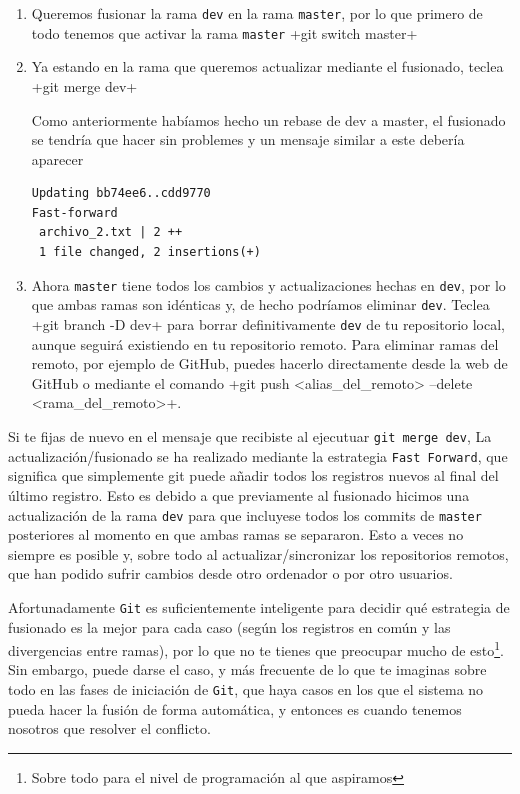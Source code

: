 \documentclass[a5paper,10pt]{article}
\begin{document}
    \begin{enumerate}
     \item Queremos fusionar la rama \verb+dev+ en la rama \verb+master+, por lo que primero de todo tenemos que activar la rama \verb+master+
     \cverb+git switch master+
     \item Ya estando en la rama que queremos actualizar mediante el fusionado, teclea
     \cverb+git merge dev+
     
     Como anteriormente habíamos hecho un rebase de dev a master, el fusionado se tendría que hacer sin problemes y un mensaje similar a este debería aparecer
     \begin{lstlisting}[style=custom]
Updating bb74ee6..cdd9770
Fast-forward
 archivo_2.txt | 2 ++
 1 file changed, 2 insertions(+)
     \end{lstlisting}
     
     \item Ahora \verb+master+ tiene todos los cambios y actualizaciones hechas en \verb+dev+, por lo que ambas ramas son idénticas y, de hecho podríamos eliminar \verb+dev+. Teclea 
     \cverb+git branch -D dev+ para borrar definitivamente \verb+dev+ de tu repositorio local, aunque seguirá existiendo en tu repositorio remoto. Para eliminar ramas del remoto, por ejemplo de GitHub, puedes hacerlo directamente desde la web de GitHub o mediante el comando \cverb+git push <alias_del_remoto>  --delete <rama_del_remoto>+.

    \end{enumerate}
    
    Si te fijas de nuevo en el mensaje que recibiste al ejecutuar \verb+git merge dev+, La actualización/fusionado se ha realizado mediante la estrategia \verb+Fast Forward+, que significa que simplemente git puede añadir todos los registros nuevos al final del último registro. Esto es debido a que previamente al fusionado hicimos una actualización de la rama \verb+dev+ para que incluyese todos los commits de \verb+master+ posteriores al momento en que ambas ramas se separaron. Esto a veces no siempre es posible y, sobre todo al actualizar/sincronizar los repositorios remotos, que han podido sufrir cambios desde otro ordenador o por otro usuarios. 
    
    Afortunadamente \verb+Git+ es suficientemente inteligente para decidir qué estrategia de fusionado es la mejor para cada caso (según los registros en común y las divergencias entre ramas), por lo que no te tienes que preocupar mucho de esto\footnote{Sobre todo para el nivel de programación al que aspiramos}. Sin embargo, puede darse el caso, y más frecuente de lo que te imaginas sobre todo en las fases de iniciación de \verb+Git+, que haya casos en los que el sistema no pueda hacer la fusión de forma automática, y entonces es cuando tenemos nosotros que resolver el conflicto.
  
\end{document}
